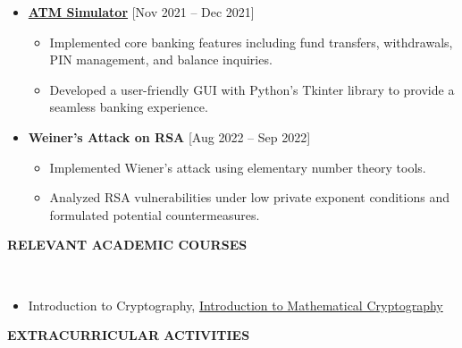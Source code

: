 \documentclass[10pt,article]{article}
\newcommand{\resheading}[1]{%
  {\small \colorbox{mygrey}{%
  \begin{minipage}{0.99\textwidth}\centering \textbf{#1 \vphantom{p\^{E}}}\end{minipage}}}}
\begin{document}
\begin{itemize}
\setlength\itemsep{0.5em}

\item \textbf{\href{https://github.com/aliztty/Atmp}{ATM Simulator}} \hfill {[Nov 2021 – Dec 2021]}
	\begin{itemize}[noitemsep,nolistsep]
	\setlength{\itemsep}{0.2cm}
	\item Implemented core banking features including fund transfers, withdrawals, PIN management, and balance inquiries.
	\item Developed a user-friendly GUI with Python's Tkinter library to provide a seamless banking experience.
	\end{itemize}

\item \textbf{Weiner’s Attack on RSA} \hfill {[Aug 2022 – Sep 2022]}
	\begin{itemize}[noitemsep,nolistsep]
	\setlength{\itemsep}{0.2cm}
	\item Implemented Wiener's attack using elementary number theory tools.
	\item Analyzed RSA vulnerabilities under low private exponent conditions and formulated potential countermeasures.
	\end{itemize}

\end{itemize}

\noindent
\resheading{RELEVANT ACADEMIC COURSES}\\[0.1pt]
\begin{itemize}[noitemsep,nolistsep]
	\item Introduction to Cryptography, \href{https://github.com/aliztty/Mcrypto?tab=readme-ov-file}{Introduction to Mathematical Cryptography}\\[0.1pt]
\end{itemize}

\noindent
\resheading{EXTRACURRICULAR ACTIVITIES}\\[-0.45cm]
\end{document}
